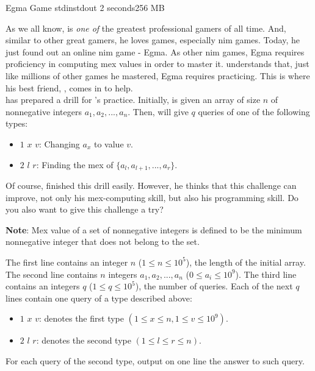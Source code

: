 \begin{problem}{Egma Game}
{stdin}{stdout}
{2 seconds}{256 MB}{}

As we all know, \TiChuot is \textit{one of} the greatest professional gamers of all time. And, similar to other great gamers, he loves games,
especially nim games. Today, he just found out an online nim game - Egma. As other nim games, Egma requires proficiency in computing mex values
in order to master it. \TiChuot understands that, just like millions of other games he mastered, Egma requires practicing. This is where his
best friend, \T, comes in to help.\\

\T has prepared a drill for \TiChuot's practice. Initially, \TiChuot is given an array of size $n$ of nonnegative integers $a_1, a_2, ..., a_n$.
Then, \T will give \TiChuot $q$ queries of one of the following types:
    \begin{itemize}
        \item
        $1$ $x$ $v$: Changing $a_x$ to value $v$.
        \item
        $2$ $l$ $r$: Finding the mex of $\{a_l, a_{l + 1}, ..., a_r\}$.
    \end{itemize}
Of course, \TiChuot finished this drill easily. However, he thinks that this challenge can improve, not only his mex-computing skill, but also
his programming skill. Do you also want to give this challenge a try?

\textbf{Note}: Mex value of a set of nonnegative integers is defined to be the minimum nonnegative integer that does not belong to the set.

\InputFile
The first line contains an integer $n$ ($1 \leq n \leq 10^5$), the length of the initial array. The second line contains $n$ integers $a_1,
a_2, ..., a_n$ ($0 \leq a_i \leq 10^9$). The third line contains an integers $q$ ($1 \leq q \leq 10^5$), the number of queries. Each of the
next $q$ lines contain one query of a type described above:
    \begin{itemize}
        \item
        $1$ $x$ $v$: denotes the first type $(1 \leq x \leq n, 1 \leq v \leq 10^9)$.
        \item
        $2$ $l$ $r$: denotes the second type $(1 \leq l \leq r \leq n)$.
    \end{itemize}

\OutputFile

For each query of the second type, output on one line the answer to such query.

\Examples

\begin{example}
%
\end{example}

\end{problem}
